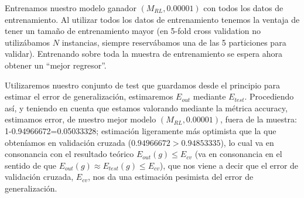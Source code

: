 \documentclass[11pt,a4paper]{article}
\theoremstyle{definition}
\begin{document}
	Entrenamos nuestro modelo ganador $(M_{RL},0.00001)$ con todos los datos de entrenamiento. Al utilizar todos los datos de entrenamiento tenemos la ventaja de tener un tamaño de entrenamiento mayor (en 5-fold cross validation no utilizábamos $N$ instancias, siempre reservábamos una de las 5 particiones para validar). Entrenando sobre toda la muestra de entrenamiento se espera ahora obtener un ``mejor regresor''.
	
	 Utilizaremos nuestro conjunto de test que guardamos desde el principio para estimar el error de generalización, estimaremos $E_{out}$ mediante $E_{test}$. Procediendo así, y teniendo en cuenta que estamos valorando mediante la métrica accuracy, estimamos error, de nuestro mejor modelo $(M_{RL},0.00001)$, fuera de la muestra: 1-0.94966672=0.05033328; estimación ligeramente más optimista que la que obteníamos en validación cruzada ($0.94966672>0.94853335$), lo cual va en consonancia con el resultado teórico $E_{out}(g) \leq E_{cv}$ (va en consonancia en el sentido de que $E_{out}(g)\approx E_{test}(g)\leq E_{cv}$), que nos viene a decir que el error de validación cruzada, $E_{cv}$, nos da una estimación pesimista del error de generalización.
\end{document}
